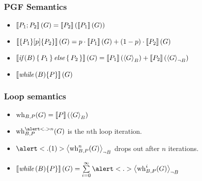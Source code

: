 \begin{frame}
	\frametitle{PGF Semantics}
	\begin{itemize}[<+->]
		\itemspacing{20pt}
		\item $\smtx{P_1; P_2}(G) = \smtx{P_2}( \smtx{P_1}(G) )$
		\item $\smtx{ \{P_1\}[p]\{P_2\} }(G) = p \cdot \smtx{P_1}(G) + (1-p) \cdot \smtx{P_2}(G)$
		\item $\smtx{\ifp{B}{P_1}{P_2}}(G) = \smtx{P_1}(\resP{G}) + \smtx{P_2}(\resN{G})$
		\item $ \smtx{\while{B}{P}}(G) $
	\end{itemize}
\end{frame}

\begin{frame}
	\frametitle{Loop semantics}
	\begin{itemize}[<+->]
		\itemspacing{10pt}
		\item $ \wh(G) = \smtx{P}(\resP{G}) $
		\item $ \wh^{\alert<.>{n}}(G) $ is the $n$th loop iteration.
		\item $ \alert<.(1)>{ \resN{ \wh^{n}(G) } } $ drops out after $n$ iterations.
		\item $ \smtx{\while{B}{P}}(G)
			= \sum\limits_{i = 0}^{\infty} \alert<.>{ \resN{\wh^i(G)} } $
	\end{itemize}
\end{frame}